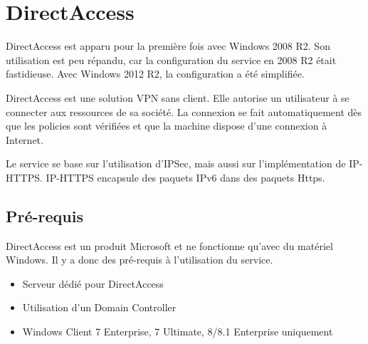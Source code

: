 \section{DirectAccess}
DirectAccess est apparu pour la première fois avec Windows 2008 R2.
Son utilisation est peu répandu, car la configuration du service en 2008 R2 était fastidieuse. 
Avec Windows 2012 R2, la configuration a été simplifiée.

DirectAccess est une solution VPN sans client. 
Elle autorise un utilisateur à se connecter aux ressources de sa société.
La connexion se fait automatiquement dès que les policies sont vérifiées et que la machine dispose d'une connexion à Internet.

Le service se base sur l'utilisation d'IPSec, mais aussi sur l'implémentation de IP-HTTPS.
IP-HTTPS encapsule des paquets IPv6 dans des paquets Https. 

\subsection{Pré-requis}
DirectAccess est un produit Microsoft et ne fonctionne qu'avec du matériel Windows.
Il y a donc des pré-requis à l'utilisation du service.
\begin{itemize}
	\item Serveur dédié pour DirectAccess
	\item Utilisation d'un Domain Controller
	\item Windows Client 7 Enterprise, 7 Ultimate, 8/8.1 Enterprise uniquement
\end{itemize}
